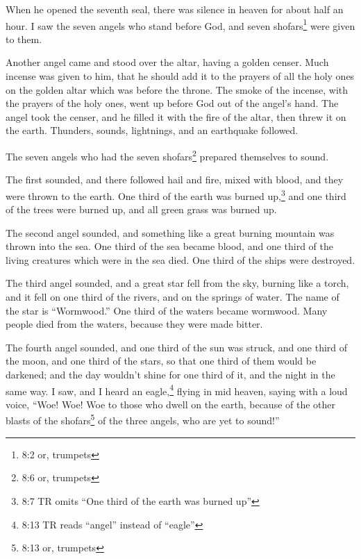 \mychapter{} \myverse*{}When he opened the seventh seal, there was silence in heaven for
about half an hour.
\myverse{}I saw the seven angels who stand before God, and seven shofars\footnote{8:2 or, trumpets}
were given to them.

\myverse{}Another angel came and stood over the altar, having a golden censer.
Much incense was given to him, that he should add it to the prayers of all the holy ones on the golden
altar which was before the throne.
\myverse{}The smoke of the incense, with the prayers of the holy ones, went up before
God out of the angel’s hand.
\myverse{}The angel took the censer, and he filled it with the fire of the altar, then
threw it on the earth. Thunders, sounds, lightnings, and an earthquake followed.

\myverse{}The seven angels who had the seven shofars\footnote{8:6 or, trumpets}
prepared themselves to sound.

\myverse{}The first sounded, and there followed hail and fire, mixed with
blood, and they were thrown to the earth. One third of the earth was burned up,\footnote{8:7 TR omits “One third of the earth was burned up”} and one third of the trees were burned
up, and all green grass was burned up.

\myverse{}The second angel sounded, and something like a great burning mountain
was thrown into the sea. One third of the sea became blood,
\myverse{}and one third of the living creatures which were in the sea died. One third
of the ships were destroyed.

\myverse{}The third angel sounded, and a great star fell from the sky,
burning like a torch, and it fell on one third of the rivers, and on the springs of water.
\myverse{}The name of the star is “Wormwood.” One third of the waters became wormwood.
Many people died from the waters, because they were made bitter.

\myverse{}The fourth angel sounded, and one third of the sun was struck,
and one third of the moon, and one third of the stars, so that one third of them would be darkened; and
the day wouldn’t shine for one third of it, and the night in the same way.
\myverse{}I saw, and I heard an eagle,\footnote{8:13 TR reads “angel” instead of “eagle”
} flying in mid heaven, saying with a loud voice, “Woe! Woe! Woe to those who dwell on the earth,
because of the other blasts of the shofars\footnote{8:13 or, trumpets} of the three angels, who are
yet to sound!”



